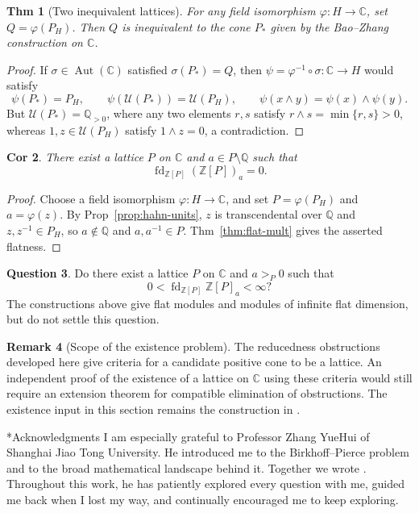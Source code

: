 \documentclass[10pt,letterpaper]{amsart}
\makeatletter
\numberwithin{equation}{section}
\newtheorem{thm}{Thm}[section]
\newtheorem{cor}[thm]{Cor}
\theoremstyle{definition}
\newtheorem{rem}[thm]{Remark}
\newtheorem{ques}[thm]{Question}
\newcommand{\Z}{\mathbb Z}
\newcommand{\Q}{\mathbb Q}
\newcommand{\C}{\mathbb C}
\newcommand{\fd}{\operatorname{fd}}
\def\section{\@startsection{section}{1}
  \z@{1.1\linespacing\@plus.5\linespacing}{.6\linespacing}
  {\normalfont\fontsize{13}{16}\selectfont\bfseries\boldmath\centering}}
\makeatother
\begin{document}
\begin{thm}[Two inequivalent lattices]\label{thm:inequivalent}
For any field isomorphism $\varphi:H\to\C$, set $Q=\varphi(P_H)$. Then $Q$ is inequivalent to the cone $P_*$ given by the Bao--Zhang construction on $\C$.
\end{thm}
\begin{proof}
If $\sigma\in\operatorname{Aut}(\C)$ satisfied $\sigma(P_*)=Q$, then $\psi=\varphi^{-1}\circ\sigma:\C\to H$ would satisfy
\[
\psi(P_*)=P_H,\qquad
\psi(\mathcal U(P_*))=\mathcal U(P_H),\qquad
\psi(x\wedge y)=\psi(x)\wedge\psi(y).
\]
But $\mathcal U(P_*)=\Q_{>0}$, where any two elements $r,s$ satisfy $r\wedge s=\min\{r,s\}>0$, whereas $1,z\in\mathcal U(P_H)$ satisfy $1\wedge z=0$, a contradiction.
\end{proof}

\begin{cor}\label{cor:not-all-extreme}
There exist a lattice $P$ on $\C$ and $a\in P\setminus\Q$ such that
\[
\fd_{\Z[P]}(\Z[P])_a=0.
\]
\end{cor}
\begin{proof}
Choose a field isomorphism $\varphi:H\to\C$, and set $P=\varphi(P_H)$ and $a=\varphi(z)$. By Prop~\ref{prop:hahn-units}, $z$ is transcendental over $\Q$ and $z,z^{-1}\in P_H$, so $a\notin\Q$ and $a,a^{-1}\in P$. Thm~\ref{thm:flat-mult} gives the asserted flatness.
\end{proof}

\begin{ques}\label{question:finite-positive}
Do there exist a lattice $P$ on $\C$ and $a>_P0$ such that
\[
0<\fd_{\Z[P]}\Z[P]_a<\infty?
\]
The constructions above give flat modules and modules of infinite flat dimension, but do not settle this question.
\end{ques}

\begin{rem}[Scope of the existence problem]\label{rem:existence}
The reducedness obstructions developed here give criteria for a candidate positive cone to be a lattice. An independent proof of the existence of a lattice on $\C$ using these criteria would still require an extension theorem for compatible elimination of obstructions. The existence input in this section remains the construction in \cite{BY}.
\end{rem}

\section*{Acknowledgments}
I am especially grateful to Professor Zhang YueHui of Shanghai Jiao Tong University. He introduced me to the Birkhoff--Pierce problem and to the broad mathematical landscape behind it. Together we wrote \cite{BY}. Throughout this work, he has patiently explored every question with me, guided me back when I lost my way, and continually encouraged me to keep exploring.
\end{document}
